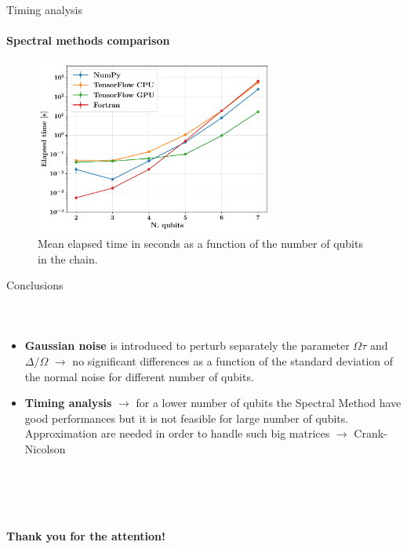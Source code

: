 \documentclass[8pt]{beamer}
\begin{document}
\begin{frame}[c]{Timing analysis}
\framesubtitle{Spectral methods comparison}
    \begin{figure}[H]
    \centering
    \includegraphics[width=0.7\textwidth]{images/timing/timing_spectral_comparison.pdf}
    \caption{Mean elapsed time in seconds as a function of the number of qubits in the chain.}
    \end{figure}
\end{frame}


\begin{frame}{Conclusions}
\framesubtitle{~}  
\begin{itemize}
    \item \textbf{Gaussian noise} is introduced to perturb separately the parameter $\Omega\tau$ and $\Delta/\Omega$ $\rightarrow$ no significant differences as a function of the standard deviation of the normal noise for different number of qubits.
    \item \textbf{Timing analysis} $\rightarrow$ for a lower number of qubits the Spectral Method have good performances but it is not feasible for large number of qubits. Approximation are needed in order to handle such big matrices $\rightarrow$ Crank-Nicolson
\end{itemize}
\end{frame}	

\begin{frame}{~}
\framesubtitle{~}  
\begin{center}
    \begin{minipage}[c]{0.55\textwidth}
        \begin{tcolorbox}[colframe=mydarkblue,colback=myblue,coltext=black]            \begin{center}
        \Huge \textbf{Thank you for the attention!}
        \end{center}
        \end{tcolorbox}
    \end{minipage}
\end{center}
\end{frame}	

 
\end{document}
